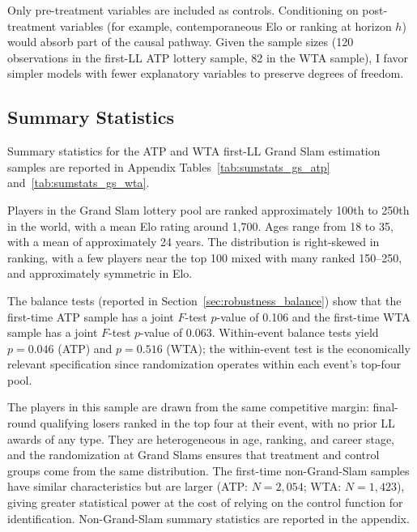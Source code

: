 Only pre-treatment variables are included as controls. Conditioning on post-treatment variables (for example, contemporaneous Elo or ranking at horizon $h$) would absorb part of the causal pathway. Given the sample sizes (120 observations in the first-LL ATP lottery sample, 82 in the WTA sample), I favor simpler models with fewer explanatory variables to preserve degrees of freedom.

\subsection{Summary Statistics}
\label{sec:data_summary}

Summary statistics for the ATP and WTA first-LL Grand Slam estimation samples are reported in Appendix Tables~\ref{tab:sumstats_gs_atp} and~\ref{tab:sumstats_gs_wta}.

Players in the Grand Slam lottery pool are ranked approximately 100th to 250th in the world, with a mean Elo rating around 1,700. Ages range from 18 to 35, with a mean of approximately 24 years. The distribution is right-skewed in ranking, with a few players near the top 100 mixed with many ranked 150--250, and approximately symmetric in Elo.

The balance tests (reported in Section~\ref{sec:robustness_balance}) show that the first-time ATP sample has a joint $F$-test $p$-value of 0.106 and the first-time WTA sample has a joint $F$-test $p$-value of 0.063. Within-event balance tests yield $p = 0.046$ (ATP) and $p = 0.516$ (WTA); the within-event test is the economically relevant specification since randomization operates within each event's top-four pool.

The players in this sample are drawn from the same competitive margin: final-round qualifying losers ranked in the top four at their event, with no prior LL awards of any type. They are heterogeneous in age, ranking, and career stage, and the randomization at Grand Slams ensures that treatment and control groups come from the same distribution. The first-time non-Grand-Slam samples have similar characteristics but are larger (ATP: $N = 2{,}054$; WTA: $N = 1{,}423$), giving greater statistical power at the cost of relying on the control function for identification. Non-Grand-Slam summary statistics are reported in the appendix.
